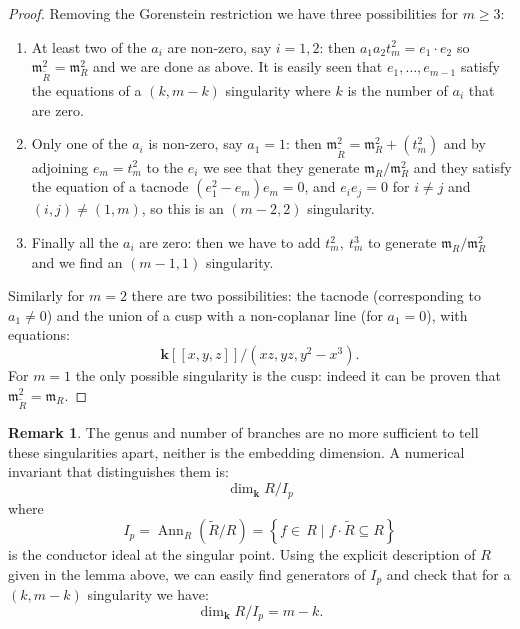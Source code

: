 \documentclass[11pt]{amsart}
\renewcommand{\k}{\mathbf k}
\theoremstyle{plain}
\theoremstyle{definition}
\newtheorem{remark}[thm]{Remark}
\begin{document}
\begin{proof}
Removing the Gorenstein restriction we have three possibilities for $m\geq 3$:
\begin{enumerate}
\item At least two of the $a_i$ are non-zero, say $i=1,2$: then $a_1a_2t_m^2=e_1\cdot e_2$ so $\mathfrak{m}^2_{\widetilde{R}}=\mathfrak{m}^2_{R}$ and we are done as above. It is easily seen that  $e_1,\ldots, e_{m-1}$ satisfy the equations of a $(k,m-k)$ singularity where $k$ is the number of $a_i$ that are zero.
\item Only one of the $a_i$ is non-zero, say $a_1=1$: then $\mathfrak{m}^2_{\widetilde{R}}=\mathfrak{m}^2_{R}+(t_m^2)$ and by adjoining $e_m=t_m^2$ to the $e_i$ we see that they generate $\mathfrak{m}_R/\mathfrak{m}^2_R$ and they satisfy the equation of a tacnode $(e_1^2-e_m)e_m=0$, and $e_ie_j=0$ for $i\neq j$ and $(i,j)\neq(1,m)$, so this is an $(m-2,2)$ singularity.
\item Finally all the $a_i$ are zero: then we have to add $t_m^2,\ t_m^3$ to generate $\mathfrak{m}_R/\mathfrak{m}^2_R$ and we find an $(m-1,1)$ singularity.
\end{enumerate}
\noindent Similarly for $m=2$ there are two possibilities: the tacnode (corresponding to $a_1\neq 0$) and the union of a cusp with a non-coplanar line (for $a_1=0$), with equations:
\[ \k[[x,y,z]]/(xz,yz,y^2-x^3).\]
\noindent For $m= 1$ the only possible singularity is the cusp: indeed it can be proven that $\mathfrak{m}^2_{\widetilde{R}}=\mathfrak{m}_{R}$. 
\end{proof}

\begin{remark}
 The genus and number of branches are no more sufficient to tell these singularities apart, neither is the embedding dimension. A numerical invariant that distinguishes them is:
\[ \dim_\k R/I_p \]
where 
\[I_p=\operatorname{Ann}_R(\widetilde R/R)=\left\{f\in\, R\;\rvert\; f\cdot\widetilde{R}\subseteq R\right\}\]
 is the conductor ideal at the singular point. 
 Using the explicit description of $R$ given in the lemma above, we can easily find generators of $I_p$ and check that for a $(k,m-k)$ singularity we have:
 \[ \dim_\k R/I_p=m-k.\]
\end{remark}
\end{document}
